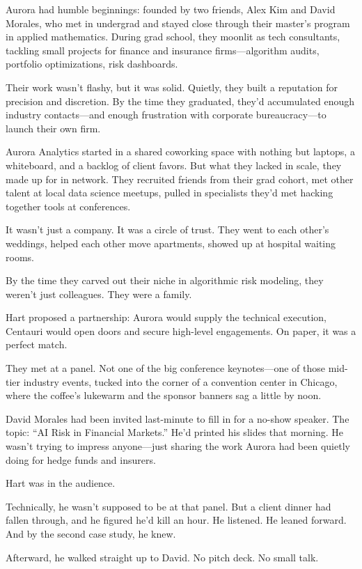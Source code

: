 Aurora had humble beginnings: founded by two friends, Alex Kim and David Morales, who met in undergrad and stayed close through their master’s program in applied mathematics. During grad school, they moonlit as tech consultants, tackling small projects for finance and insurance firms—algorithm audits, portfolio optimizations, risk dashboards.  

Their work wasn’t flashy, but it was solid. Quietly, they built a reputation for precision and discretion. By the time they graduated, they’d accumulated enough industry contacts—and enough frustration with corporate bureaucracy—to launch their own firm.

Aurora Analytics started in a shared coworking space with nothing but laptops, a whiteboard, and a backlog of client favors. But what they lacked in scale, they made up for in network. They recruited friends from their grad cohort, met other talent at local data science meetups, pulled in specialists they’d met hacking together tools at conferences.

It wasn’t just a company. It was a circle of trust. They went to each other’s weddings, helped each other move apartments, showed up at hospital waiting rooms.  

By the time they carved out their niche in algorithmic risk modeling, they weren’t just colleagues. They were a family.

Hart proposed a partnership: Aurora would supply the technical execution, Centauri would open doors and secure high-level engagements. On paper, it was a perfect match.

They met at a panel. Not one of the big conference keynotes—one of those mid-tier industry events, tucked into the corner of a convention center in Chicago, where the coffee’s lukewarm and the sponsor banners sag a little by noon.

David Morales had been invited last-minute to fill in for a no-show speaker. The topic: “AI Risk in Financial Markets.” He’d printed his slides that morning. He wasn’t trying to impress anyone—just sharing the work Aurora had been quietly doing for hedge funds and insurers.

Hart was in the audience.

Technically, he wasn’t supposed to be at that panel. But a client dinner had fallen through, and he figured he’d kill an hour. He listened. He leaned forward. And by the second case study, he knew.

Afterward, he walked straight up to David. No pitch deck. No small talk.

